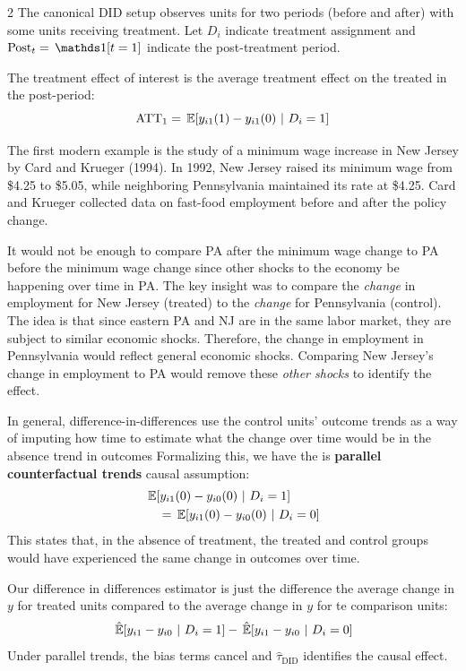 \documentclass[12pt]{article}
\begin{document}
\begin{multicols}{2}
The canonical DID setup observes units for two periods (before and after) with some units receiving treatment.
Let $D_i$ indicate treatment assignment and $\text{Post}_t = \one{t = 1}$ indicate the post-treatment period.

The treatment effect of interest is the average treatment effect on the treated in the post-period:
$$
  \text{ATT}_1 = \expec{y_{i1}(1) - y_{i1}(0)}{D_i = 1}
$$

The first modern example is the study of a minimum wage increase in New Jersey by Card and Krueger (1994).
In 1992, New Jersey raised its minimum wage from \$4.25 to \$5.05, while neighboring Pennsylvania maintained its rate at \$4.25.
Card and Krueger collected data on fast-food employment before and after the policy change.

It would not be enough to compare PA after the minimum wage change to PA before the minimum wage change since other shocks to the economy be happening over time in PA. 
The key insight was to compare the \emph{change} in employment for New Jersey (treated) to the \emph{change} for Pennsylvania (control).
The idea is that since eastern PA and NJ are in the same labor market, they are subject to similar economic shocks. 
Therefore, the change in employment in Pennsylvania would reflect general economic shocks. 
Comparing New Jersey's change in employment to PA would remove these \emph{other shocks} to identify the effect.

In general, difference-in-differences use the control units' outcome trends as a way of imputing how time  to estimate what the change over time would be in the absence trend in outcomes
Formalizing this, we have the is \textbf{parallel counterfactual trends}  causal assumption:
\begin{align*}
  &\expec{y_{i1}(0) - y_{i0}(0)}{D_i = 1} \\
  &\quad= \expec{y_{i1}(0) - y_{i0}(0)}{D_i = 0}
\end{align*}
This states that, in the absence of treatment, the treated and control groups would have experienced the same change in outcomes over time.

Our difference in differences estimator is just the difference the average change in $y$ for treated units compared to the average change in $y$ for te comparison units: 
$$
  \expechat{y_{i1} - y_{i0}}{D_i = 1} - \expechat{y_{i1} - y_{i0}}{D_i = 0}
$$
Under parallel trends, the bias terms cancel and $\hat{\tau}_{\text{DID}}$ identifies the causal effect.


\end{multicols}
\end{document}
